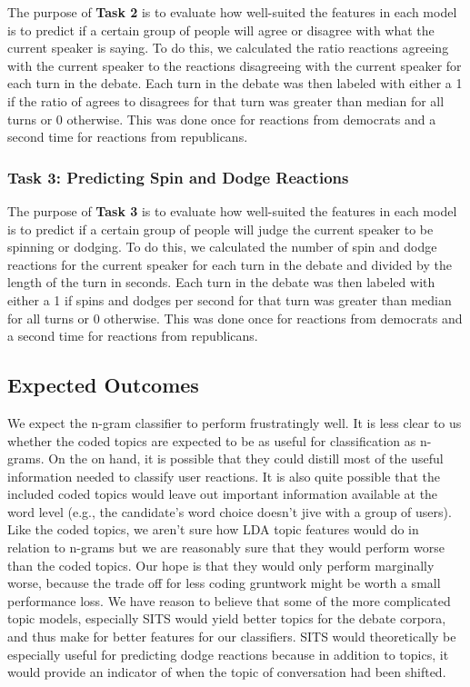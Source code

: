 The purpose of \textbf{Task 2} is to evaluate how well-suited the features in each model is to predict if a certain group of people will agree or disagree with what the current speaker is saying.
To do this, we calculated the ratio reactions agreeing with the current speaker to the reactions disagreeing with the current speaker for each turn in the debate.
Each turn in the debate was then labeled with either a 1 if the ratio of agrees to disagrees for that turn was greater than median for all turns or 0 otherwise.
This was done once for reactions from democrats and a second time for reactions from republicans.

\subsubsection{Task 3: Predicting Spin and Dodge Reactions}

The purpose of \textbf{Task 3} is to evaluate how well-suited the features in each model is to predict if a certain group of people will judge the current speaker to be spinning or dodging.
To do this, we calculated the number of spin and dodge reactions for the current speaker for each turn in the debate and divided by the length of the turn in seconds.
Each turn in the debate was then labeled with either a 1 if spins and dodges per second for that turn was greater than median for all turns or 0 otherwise.
This was done once for reactions from democrats and a second time for reactions from republicans.


\subsection{Expected Outcomes}

We expect the n-gram classifier to perform frustratingly well.
It is less clear to us whether the coded topics are expected to be as useful for classification as n-grams.
On the on hand, it is possible that they could distill most of the useful information needed to classify user reactions.
It is also quite possible that the included coded topics would leave out important information available at the word level (e.g., the candidate's word choice doesn't jive with a group of users).
Like the coded topics, we aren't sure how LDA topic features would do in relation to n-grams but we are reasonably sure that they would perform worse than the coded topics.
Our hope is that they would only perform marginally worse, because the trade off for less coding gruntwork might be worth a small performance loss.
We have reason to believe that some of the more complicated topic models, especially SITS would yield better topics for the debate corpora, and thus make for better features for our classifiers.
SITS would theoretically be especially useful for predicting dodge reactions because in addition to topics, it would provide an indicator of when the topic of conversation had been shifted.
